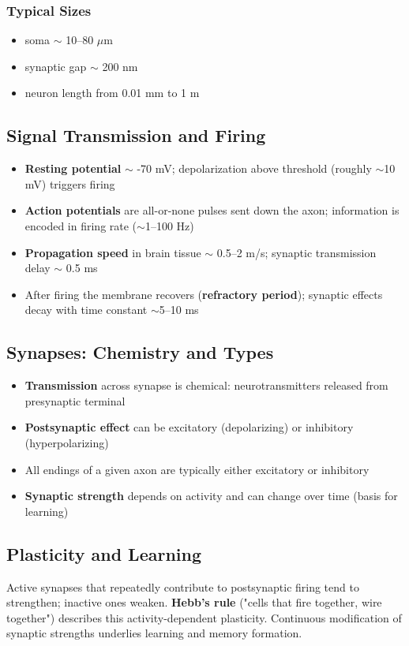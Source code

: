 \subsubsection{Typical Sizes}
\begin{itemize}
    \item soma $\sim$ 10--80 $\mu$m
    \item synaptic gap $\sim$ 200 nm
    \item neuron length from 0.01 mm to 1 m
\end{itemize}

\subsection{Signal Transmission and Firing}
\begin{itemize}
    \item \textbf{Resting potential} $\sim$ -70 mV; depolarization above threshold (roughly $\sim$10 mV) triggers firing
    \item \textbf{Action potentials} are all-or-none pulses sent down the axon; information is encoded in firing rate ($\sim$1--100 Hz)
    \item \textbf{Propagation speed} in brain tissue $\sim$ 0.5--2 m/s; synaptic transmission delay $\sim$ 0.5 ms
    \item After firing the membrane recovers (\textbf{refractory period}); synaptic effects decay with time constant $\sim$5--10 ms
\end{itemize}

\subsection{Synapses: Chemistry and Types}
\begin{itemize}
    \item \textbf{Transmission} across synapse is chemical: neurotransmitters released from presynaptic terminal
    \item \textbf{Postsynaptic effect} can be excitatory (depolarizing) or inhibitory (hyperpolarizing)
    \item All endings of a given axon are typically either excitatory or inhibitory
    \item \textbf{Synaptic strength} depends on activity and can change over time (basis for learning)
\end{itemize}



\subsection{Plasticity and Learning}
Active synapses that repeatedly contribute to postsynaptic firing tend to strengthen; inactive ones weaken. \textbf{Hebb's rule} ("cells that fire together, wire together") describes this activity-dependent plasticity. Continuous modification of synaptic strengths underlies learning and memory formation.

